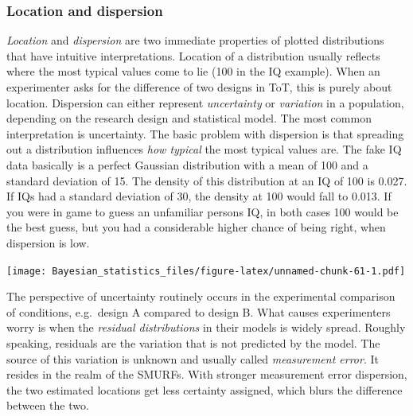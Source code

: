 \documentclass[]{svmono}
\newenvironment{Shaded}{\begin{snugshade}}{\end{snugshade}}
\newcommand{\KeywordTok}[1]{\textcolor[rgb]{0.13,0.29,0.53}{\textbf{#1}}}
\newcommand{\DataTypeTok}[1]{\textcolor[rgb]{0.13,0.29,0.53}{#1}}
\newcommand{\DecValTok}[1]{\textcolor[rgb]{0.00,0.00,0.81}{#1}}
\newcommand{\StringTok}[1]{\textcolor[rgb]{0.31,0.60,0.02}{#1}}
\newcommand{\OperatorTok}[1]{\textcolor[rgb]{0.81,0.36,0.00}{\textbf{#1}}}
\newcommand{\NormalTok}[1]{#1}
\theoremstyle{definition}
\theoremstyle{definition}
\theoremstyle{definition}
\theoremstyle{remark}
\begin{document}
\subsubsection{Location and dispersion}\label{location-and-dispersion}

\emph{Location} and \emph{dispersion} are two immediate properties of
plotted distributions that have intuitive interpretations. Location of a
distribution usually reflects where the most typical values come to lie
(100 in the IQ example). When an experimenter asks for the difference of
two designs in ToT, this is purely about location. Dispersion can either
represent \emph{uncertainty} or \emph{variation} in a population,
depending on the research design and statistical model. The most common
interpretation is uncertainty. The basic problem with dispersion is that
spreading out a distribution influences \emph{how typical} the most
typical values are. The fake IQ data basically is a perfect Gaussian
distribution with a mean of 100 and a standard deviation of 15. The
density of this distribution at an IQ of 100 is 0.027. If IQs had a
standard deviation of 30, the density at 100 would fall to 0.013. If you
were in game to guess an unfamiliar persons IQ, in both cases 100 would
be the best guess, but you had a considerable higher chance of being
right, when dispersion is low.

\begin{Shaded}
\end{Shaded}

\texttt{[image: Bayesian\_statistics\_files/figure-latex/unnamed-chunk-61-1.pdf]}

The perspective of uncertainty routinely occurs in the experimental
comparison of conditions, e.g.~design A compared to design B. What
causes experimenters worry is when the \emph{residual distributions} in
their models is widely spread. Roughly speaking, residuals are the
variation that is not predicted by the model. The source of this
variation is unknown and usually called \emph{measurement error}. It
resides in the realm of the SMURFs. With stronger measurement error
dispersion, the two estimated locations get less certainty assigned,
which blurs the difference between the two.
\end{document}
